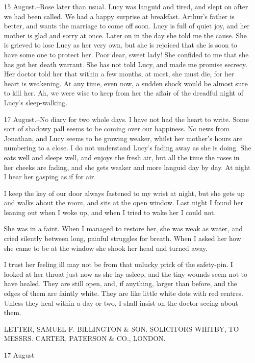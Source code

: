 15 August.--Rose later than usual. Lucy was languid and tired, and slept on after we had been called. We had a happy surprise at breakfast. Arthur's father is better, and wants the marriage to come off soon. Lucy is full of quiet joy, and her mother is glad and sorry at once. Later on in the day she told me the cause. She is grieved to lose Lucy as her very own, but she is rejoiced that she is soon to have some one to protect her. Poor dear, sweet lady! She confided to me that she has got her death warrant. She has not told Lucy, and made me promise secrecy. Her doctor told her that within a few months, at most, she must die, for her heart is weakening. At any time, even now, a sudden shock would be almost sure to kill her. Ah, we were wise to keep from her the affair of the dreadful night of Lucy's sleep-walking. 

17 August.--No diary for two whole days. I have not had the heart to write. Some sort of shadowy pall seems to be coming over our happiness. No news from Jonathan, and Lucy seems to be growing weaker, whilst her mother's hours are numbering to a close. I do not understand Lucy's fading away as she is doing. She eats well and sleeps well, and enjoys the fresh air, but all the time the roses in her cheeks are fading, and she gets weaker and more languid day by day. At night I hear her gasping as if for air. 

I keep the key of our door always fastened to my wrist at night, but she gets up and walks about the room, and sits at the open window. Last night I found her leaning out when I woke up, and when I tried to wake her I could not. 

She was in a faint. When I managed to restore her, she was weak as water, and cried silently between long, painful struggles for breath. When I asked her how she came to be at the window she shook her head and turned away. 

I trust her feeling ill may not be from that unlucky prick of the safety-pin. I looked at her throat just now as she lay asleep, and the tiny wounds seem not to have healed. They are still open, and, if anything, larger than before, and the edges of them are faintly white. They are like little white dots with red centres. Unless they heal within a day or two, I shall insist on the doctor seeing about them. 

LETTER, SAMUEL F. BILLINGTON \& SON, SOLICITORS WHITBY, TO MESSRS. CARTER, PATERSON \& CO., LONDON. 

17 August 

